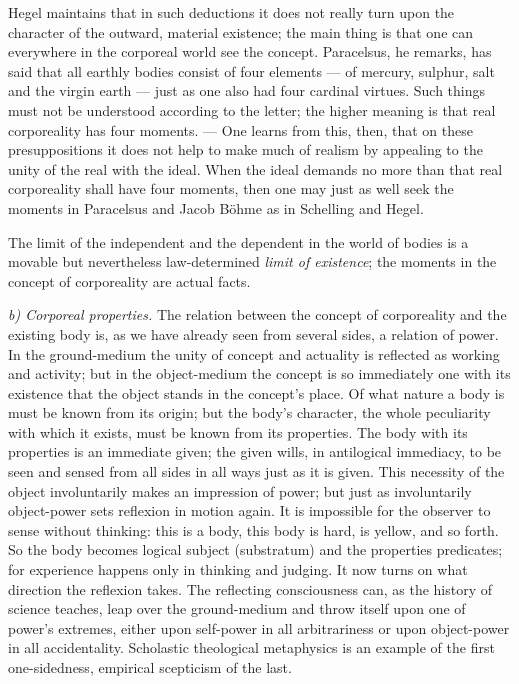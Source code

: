 \documentclass[12pt,a4paper]{book}
\newcommand{\runin}[1]{\emph{#1}\hspace{0.4em}}
\begin{document}
Hegel maintains that in such deductions it does not really turn upon the character of the outward, material existence;
the main thing is that one can everywhere in the corporeal world see the concept. Paracelsus, he remarks, has said that
all earthly bodies consist of four elements --- of mercury, sulphur, salt and the virgin earth --- just as one also had
four cardinal virtues. Such things must not be understood according to the letter; the higher meaning is that
real corporeality has four moments. --- One learns from this, then, that on these presuppositions it does not help to
make much of realism by appealing to the unity of the real with the ideal. When the ideal demands no more than that real
corporeality shall have four moments, then one may just as well seek the moments in Paracelsus and Jacob Böhme as in
Schelling and Hegel.

The limit of the independent and the dependent in the world of bodies is a movable but nevertheless law-determined
\emph{limit of existence}; the moments in the concept of corporeality are actual facts.

\runin{b) Corporeal properties.} The relation between the concept of corporeality and the existing body is, as we have
already seen from several sides, a relation of power. In the ground-medium the unity of concept and actuality is
reflected as working and activity; but in the object-medium the concept is so immediately one with its existence that
the object stands in the concept's place. Of what nature a body is must be known from its origin; but the body's
character, the whole peculiarity with which it exists, must be known from its properties. The body with its properties is
an immediate given; the given wills, in antilogical immediacy, to be seen and sensed from all sides in all ways just as
it is given. This necessity of the object involuntarily makes an impression of power; but just as involuntarily
object-power sets reflexion in motion again. It is impossible for the observer to sense without thinking: this is a body,
this body is hard, is yellow, and so forth. So the body becomes logical subject (substratum) and the properties
predicates; for experience happens only in thinking and judging. It now turns on what direction the reflexion takes. The
reflecting consciousness can, as the history of science teaches,
leap over the ground-medium and throw itself upon one of power's extremes, either upon self-power in all arbitrariness or
upon object-power in all accidentality. Scholastic theological metaphysics is an example of the first one-sidedness,
empirical scepticism of the last.
\end{document}

